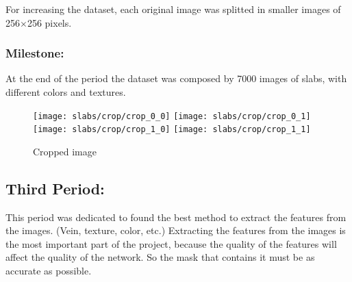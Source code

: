 For increasing the dataset, each original image was splitted in smaller images of 256$\times$256 pixels.

\subsubsection{Milestone:}

At the end of the period the dataset was composed by 7000 images of slabs, with different colors and textures.


\begin{figure}
    \centering
    \texttt{[image: slabs/crop/crop\_0\_0]}
    \texttt{[image: slabs/crop/crop\_0\_1]}
    \\
    \texttt{[image: slabs/crop/crop\_1\_0]}
    \texttt{[image: slabs/crop/crop\_1\_1]}
    \caption{Cropped image}\label{fig:foobar}
\end{figure}

\subsection{Third Period:}
This period was dedicated to found the best method to extract the features from the images. (Vein, texture, color, etc.)
Extracting the features from the images is the most important part of the project, because the quality of the features will affect the quality of the network.
So the mask that contains it must be as accurate as possible.

